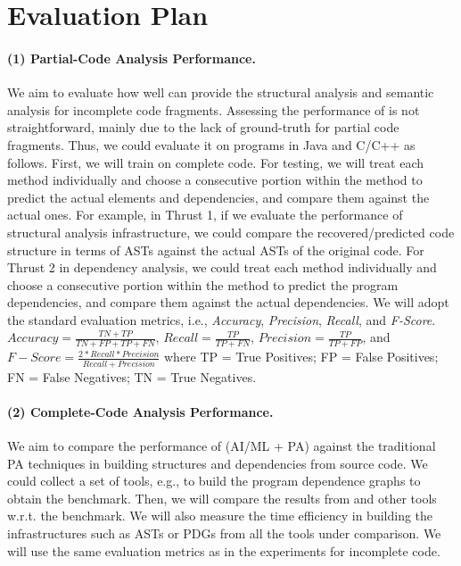 \section{Evaluation Plan}
\label{eval}






\paragraph{\bf (1) Partial-Code Analysis Performance.} We aim
to evaluate how well {\tool} can provide the structural analysis and
semantic analysis for incomplete code fragments.  Assessing the
performance of \tool is not straightforward, mainly due to the lack of
ground-truth for partial code fragments. Thus, we could evaluate it on
programs in Java and C/C++ as follows.  First, we will train {\tool} on
complete code. For testing, we will treat each method individually and
choose a consecutive portion within the method to predict the actual
elements and dependencies, and compare them against the actual ones.
For example, in Thrust 1, if we evaluate the performance of structural
analysis infrastructure, we could compare the recovered/predicted code
structure in terms of ASTs against the actual ASTs of the original
code. For Thrust 2 in dependency analysis, we could treat each method
individually and choose a consecutive portion within the method to
predict the program dependencies, and compare them against the actual
dependencies. We will adopt the standard evaluation metrics, i.e.,
\textit{Accuracy}, \textit{Precision}, \textit{Recall}, and
\textit{F-Score}. $Accuracy = \frac{TN+TP}{TN+FP+TP+FN}$, $Recall =
\frac{TP}{TP+FN}$, $Precision = \frac{TP}{TP+FP}$, and $F{-}Score =
\frac{2*Recall*Precision}{Recall+Precision}$ where TP = True
Positives; FP = False Positives; FN = False Negatives; TN = True
Negatives.

\paragraph{\bf (2) Complete-Code Analysis Performance.}
We aim to compare the performance of {\tool} (AI/ML + PA) against the
traditional PA techniques in building structures and dependencies from
source code. We could collect a set of tools, e.g., to build the
program dependence graphs to obtain the benchmark. Then, we will
compare the results from {\tool} and other tools w.r.t. the
benchmark. We will also measure the time efficiency in building the
infrastructures such as ASTs or PDGs from all the tools under
comparison. We will use the same evaluation metrics as in the
experiments for incomplete code.


